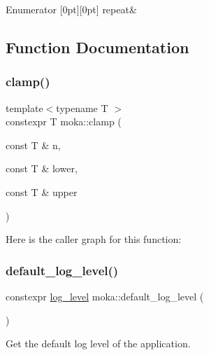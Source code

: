 \begin{DoxyEnumFields}{Enumerator}
[0pt][0pt]{}\mbox{\label{namespacemoka_afda3faa87bacaacc6008d8c1f73f6462a32cf6da134a8b268cf4ab6b79a9a5ad9}} 
repeat&\\
\hline

\end{DoxyEnumFields}


\subsection{Function Documentation}
\mbox{\label{namespacemoka_a2486d1231c4edb9da9ec840669627aa5}} 
\subsubsection{\texorpdfstring{clamp()}{clamp()}}
{\footnotesize\ttfamily template$<$typename T $>$ \\
constexpr T moka\+::clamp (\begin{DoxyParamCaption}\item[{const T \&}]{n,  }\item[{const T \&}]{lower,  }\item[{const T \&}]{upper }\end{DoxyParamCaption})\hspace{0.3cm}{\ttfamily [noexcept]}}

Here is the caller graph for this function\+:
\mbox{\label{namespacemoka_ac3f7b72250cd352011df4f431c862df5}} 
\subsubsection{\texorpdfstring{default\_log\_level()}{default\_log\_level()}}
{\footnotesize\ttfamily constexpr \mbox{\hyperlink{namespacemoka_a7c4111664aee7737c54ab37376b2637d}{log\+\_\+level}} moka\+::default\+\_\+log\+\_\+level (\begin{DoxyParamCaption}{ }\end{DoxyParamCaption})}



Get the default log level of the application. 

